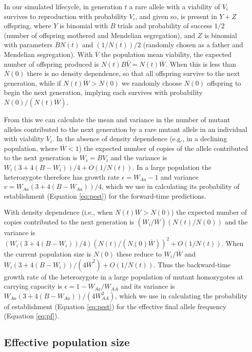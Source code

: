 \documentclass[]{article}
\begin{document}
In our simulated lifecycle, in generation $t$ a rare allele with a viability of $V_i$ survives to reproduction with probability $V_i$, and given so, is present in $Y+Z$ offspring, where $Y$ is binomial with $B$ trials and probability of success $1/2$ (number of offspring mothered and Mendelian segregation), and $Z$ is binomial with parameters $B N(t)$ and $(1/N(t))/2$ (randomly chosen as a father and Mendelian segregation).
With $\overline{V}$ the population mean viability, the expected number of offspring produced is $N(t) B \overline{V} = N(t) \overline{W}$.
When this is less than $N(0)$ there is no density dependence, so that all offspring survive to the next generation, while if $N(t) \overline{W} > N(0)$ we randomly choose $N(0)$ offspring to begin the next generation, implying each survives with probability $N(0)/(N(t)\overline{W})$.

From this we can calculate the mean and variance in the number of mutant alleles contributed to the next generation by a rare mutant allele in an individual with viability $V_i$.
In the absence of density dependence (e.g., in a declining population, where $\overline{W} < 1$) the expected number of copies of the allele contributed to the next generation is $W_i = B V_i$ and the variance is $W_i(3+4(B-W_i))/4 + O(1/N(t))$.
In a large population the heterozygote therefore has growth rate $\epsilon = W_{Aa} - 1$ and variance $v = W_{Aa}(3+4(B-W_{Aa}))/4$, which we use in calculating its probability of establishment (Equation \ref{eq:pest}) for the forward-time predictions.

With density dependence (i.e., when $N(t)\overline{W}>N(0)$) the expected number of copies contributed to the next generation is $(W_i / \overline{W})(N(t) / N(0))$ and the variance is $(W_i(3+4(B-W_i))/4)(N(t)/(N(0)\overline{W}))^2 + O(1/N(t))$.
When the current population size is $N(0)$ these reduce to $W_i / \overline{W}$ and $W_i(3+4(B-W_i))/(4\overline{W}^2) + O(1/N(t))$.
Thus the backward-time growth rate of the heterozygote in a large population of mutant homozygotes at carrying capacity is $\epsilon = 1 - W_{Aa}/W_{AA}$ and its variance is $W_{Aa}(3+4(B-W_{Aa}))/(4W_{AA}^2)$, which we use in calculating the probability of establishment (Equation \ref{eq:pest}) for the effective final allele frequency (Equation \ref{eq:pf}).

\subsection*{Effective population size}
\end{document}
